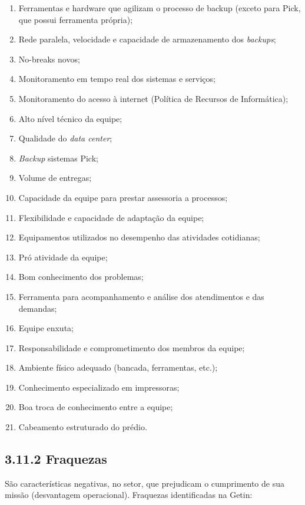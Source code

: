 \documentclass{article}
\begin{document}
\begin{enumerate}
    \item Ferramentas e hardware que agilizam o processo de backup (exceto para Pick, que possui ferramenta própria);
    \item Rede paralela, velocidade e capacidade de armazenamento dos \textit{backups};
    \item No-breaks novos;
    \item Monitoramento em tempo real dos sistemas e serviços;
    \item Monitoramento do acesso à internet (Política de Recursos de Informática);
    \item Alto nível técnico da equipe;
    \item Qualidade do \textit{data center};
    \item \textit{Backup} sistemas Pick;
    \item Volume de entregas;
    \item Capacidade da equipe para prestar assessoria a processos;
    \item Flexibilidade e capacidade de adaptação da equipe;
    \item Equipamentos utilizados no desempenho das atividades cotidianas;
    \item Pró atividade da equipe;
    \item Bom conhecimento dos problemas;
    \item Ferramenta para acompanhamento e análise dos atendimentos e das demandas;
    \item Equipe enxuta;
    \item Responsabilidade e comprometimento dos membros da equipe;
    \item Ambiente físico adequado (bancada, ferramentas, etc.);
    \item Conhecimento especializado em impressoras;
    \item Boa troca de conhecimento entre a equipe;
    \item Cabeamento estruturado do prédio.
\end{enumerate}

\subsection*{3.11.2 Fraquezas}

São características negativas, no setor, que prejudicam o cumprimento de sua missão (desvantagem operacional).
Fraquezas identificadas na Getin:
\end{document}
